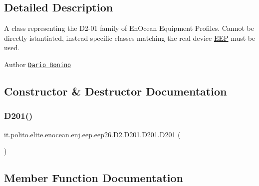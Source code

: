 \subsection{Detailed Description}
A class representing the D2-\/01 family of En\+Ocean Equipment Profiles. Cannot be directly istantiated, instead specific classes matching the real device \hyperlink{classit_1_1polito_1_1elite_1_1enocean_1_1enj_1_1eep_1_1_e_e_p}{E\+EP} must be used.

\begin{DoxyAuthor}{Author}
\href{mailto:dario.bonino@gmail.com}{\tt Dario Bonino} 
\end{DoxyAuthor}


\subsection{Constructor \& Destructor Documentation}
\hypertarget{classit_1_1polito_1_1elite_1_1enocean_1_1enj_1_1eep_1_1eep26_1_1_d2_1_1_d201_1_1_d201_ad9b55a434d1fdce1e516857217ab907a}{}\label{classit_1_1polito_1_1elite_1_1enocean_1_1enj_1_1eep_1_1eep26_1_1_d2_1_1_d201_1_1_d201_ad9b55a434d1fdce1e516857217ab907a} 
\subsubsection{\texorpdfstring{D201()}{D201()}}
{\footnotesize\ttfamily it.\+polito.\+elite.\+enocean.\+enj.\+eep.\+eep26.\+D2.\+D201.\+D201.\+D201 (\begin{DoxyParamCaption}{ }\end{DoxyParamCaption})}



\subsection{Member Function Documentation}
\hypertarget{classit_1_1polito_1_1elite_1_1enocean_1_1enj_1_1eep_1_1eep26_1_1_d2_1_1_d201_1_1_d201_a6364e553613275986e97b41db20a5737}{}\label{classit_1_1polito_1_1elite_1_1enocean_1_1enj_1_1eep_1_1eep26_1_1_d2_1_1_d201_1_1_d201_a6364e553613275986e97b41db20a5737} 
